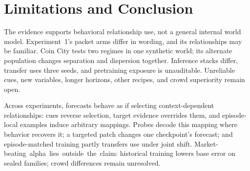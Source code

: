 \section{Limitations and Conclusion}
\label{sec:limitations}
\label{sec:conclusion}

The evidence supports behavioral relationship use, not a general internal world
model. Experiment~1's packet arms differ in wording, and its relationships may be
familiar. Coin City tests two regimes in one synthetic world; its alternate
population changes separation and dispersion together. Inference stacks differ,
transfer uses three seeds, and pretraining exposure is unauditable. Unreliable
cues, new variables, longer horizons, other recipes, and crowd superiority remain
open.

Across experiments, forecasts behave as if selecting context-dependent
relationships: cues reverse selection, target evidence overrides them, and
episode-local examples induce arbitrary mappings. Probes decode this mapping where
behavior recovers it; a targeted patch changes one checkpoint's forecast; and
episode-matched training partly transfers use under joint shift. \mbox{Market-beating
alpha lies outside the claim}: historical training lowers base error on sealed
families; crowd differences remain unresolved.
